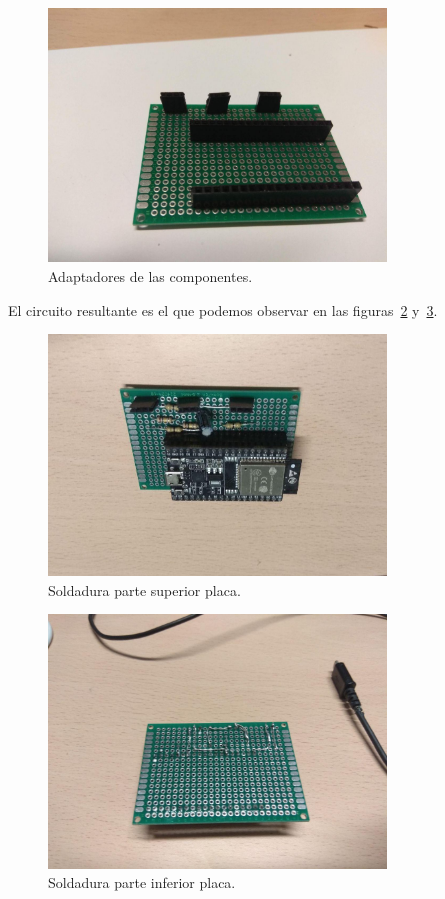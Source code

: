 \documentclass[a4paper,10pt]{article}
\begin{document}
\begin{figure}
  \centering
  \includegraphics[width=0.8\textwidth]{img/placa_con_adaptadores_pines.jpg}
  \caption{Adaptadores de las componentes.}\label{fig:visual-adaptadores}
\end{figure}

El circuito resultante es el que podemos observar en las
figuras~\ref{fig:soldado_superior} y~\ref{fig:soldado_inferior}.

\begin{figure}
  \centering
  \includegraphics[width=0.8\textwidth]{img/soldadura_superior.jpg}
  \caption{Soldadura parte superior placa.}\label{fig:soldado_superior}
\end{figure}

\begin{figure}
  \centering
  \includegraphics[width=0.8\textwidth]{img/soldadura_inferior.jpg}
  \caption{Soldadura parte inferior placa.}\label{fig:soldado_inferior}
\end{figure}
\end{document}
